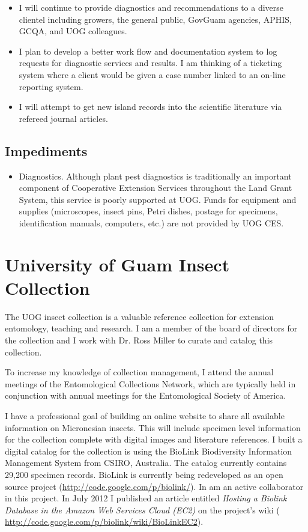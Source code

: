 \documentclass[12pt,oneside,english]{scrbook}
\begin{document}
\begin{itemize}
\item I will continue to provide diagnostics and  recommendations to a diverse clientel including growers, the general public, GovGuam agencies, APHIS, GCQA, and UOG colleagues.
\item I plan to develop a better work flow and documentation system to log requests for diagnostic services and results. I am thinking of a ticketing system where a client would be given a case number linked to an on-line reporting system.
\item I will attempt to get new island records into the scientific literature via refereed journal articles.
\end{itemize}

\subsection{Impediments}

\begin{itemize}
\item{Diagnostics.} Although plant pest diagnostics is traditionally an important component of Cooperative Extension Services throughout the Land Grant System, this service is poorly supported at UOG. Funds for equipment and supplies (microscopes, insect pins, Petri dishes, postage for specimens, identification manuals, computers, etc.) are not provided by UOG CES. 
\end{itemize}

\section{University of Guam Insect Collection}

The UOG insect collection is a valuable reference collection for extension
entomology, teaching and research. I am a member of the board of directors
for the collection and I work with Dr. Ross Miller to curate and catalog
this collection. 

To increase my knowledge of collection management, I attend the annual
meetings of the Entomological Collections Network, which are typically
held in conjunction with annual meetings for the Entomological Society
of America.

I have a professional goal of building an online website to share
all available information on Micronesian insects. This will include
specimen level information for the collection complete with digital
images and literature references. I built a digital catalog for the
collection is using the BioLink Biodiversity Information Management
System from CSIRO, Australia. The catalog currently contains 29,200
specimen records. BioLink is currently being redeveloped as an open
source project (\url{http://code.google.com/p/biolink/}). In am an active
collaborator in this project. In July 2012 I published an article
entitled \emph{Hosting a Biolink Database in the Amazon Web Services
Cloud (EC2)} on the project's wiki ( \url{http://code.google.com/p/biolink/wiki/BioLinkEC2}).
\end{document}
